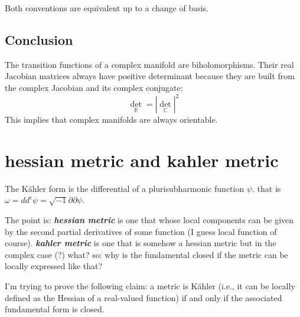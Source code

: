 Both conventions are equivalent up to a change of basis.

\subsection*{Conclusion}

The transition functions of a complex manifold are biholomorphisms. Their real Jacobian matrices always have positive determinant because they are built from the complex Jacobian and its complex conjugate:
\[
\det_{\mathbb{R}} = |\det_{\mathbb{C}}|^2
\]
This implies that complex manifolds are always orientable.

\section{hessian metric and kahler metric}

The Kähler form is the differential of a plurisubharmonic function \(\psi\). that is \(\omega=d d^c \psi=\sqrt{-1} \partial \partial \psi\).

The point is: \textit{\textbf{hessian metric}} is one that whose local components can be given by the second partial derivatives of some function (I guess local function of course). \textit{\textbf{kahler metric}} is one that is somehow a hessian metric but in the complex case (?) what? so: why is the fundamental closed if the metric can be locally expressed like that?

\begin{exercise}\leavevmode
I’m trying to prove the following claim: a metric is Kähler (i.e., it can be locally defined as the Hessian of a real-valued function) if and only if the associated fundamental form is closed.
\end{exercise}

